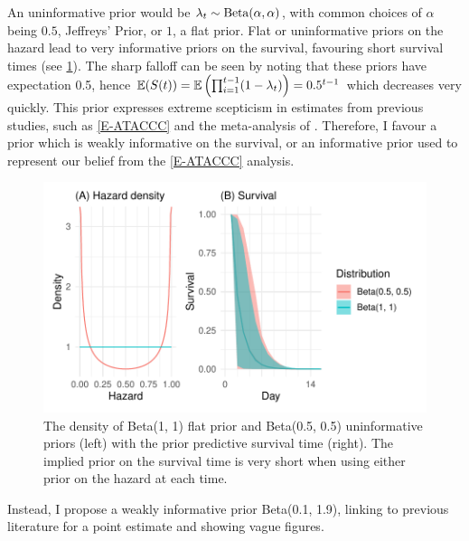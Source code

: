 \documentclass[thesis.tex]{subfiles}
\begin{document}
An uninformative prior would be $\lambda_t \sim \operatorname{Beta}(\alpha, \alpha)$, with common choices of $\alpha$ being $0.5$, Jeffreys' Prior, or $1$, a flat prior.
Flat or uninformative priors on the hazard lead to very informative priors on the survival, favouring short survival times (see \cref{perf-test:fig:flat-prior}).
The sharp falloff can be seen by noting that these priors have expectation 0.5, hence $\operatorname{\mathbb{E}}(S(t)) = \operatorname{\mathbb{E}} \left( \prod_{i=1}^{t-1} (1-\lambda_t) \right) = 0.5^{t-1}$ which decreases very quickly.
This prior expresses extreme scepticism in estimates from previous studies, such as \cref{E-ATACCC} and the meta-analysis of \textcite{cevikShedding}.
Therefore, I favour a prior which is weakly informative on the survival, or an informative prior used to represent our belief from the \cref{E-ATACCC} analysis.
\begin{figure}
  \centering \includegraphics{cis-perfect-testing/flat-prior}
  \caption{The density of Beta(1, 1) flat prior and Beta(0.5, 0.5) uninformative priors (left) with the prior predictive survival time (right). The implied prior on the survival time is very short when using either prior on the hazard at each time. \label{perf-test:fig:flat-prior}}
\end{figure}

Instead, I propose a weakly informative prior Beta(0.1, 1.9), linking to previous literature for a point estimate and showing vague figures.
\end{document}

